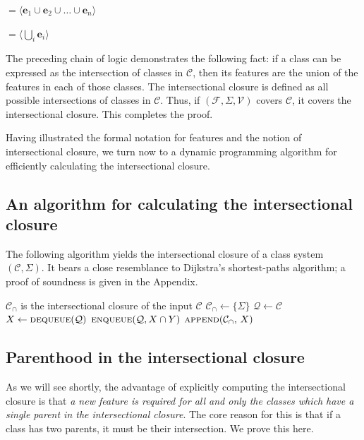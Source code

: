\documentclass[11pt, oneside]{article}   	%
\begin{document}
\quad $= \langle \mathbf{e}_1 \cup \mathbf{e}_2 \cup \ldots \cup \mathbf{e}_n \rangle$

\quad $= \langle \bigcup_i  \mathbf{e}_i \rangle$

\vspace{\baselineskip} \noindent The preceding chain of logic demonstrates the following fact: if a class can be expressed as the intersection of classes in $\mathcal C$, then its features are the union of the features in each of those classes. The intersectional closure is defined as all possible intersections of classes in $\mathcal C$. Thus, if $(\mathcal F, \Sigma, \mathcal V)$ covers $\mathcal C$, it covers the intersectional closure. This completes the proof.

Having illustrated the formal notation for features and the notion of intersectional closure, we turn now to a dynamic programming algorithm for efficiently calculating the intersectional closure.

\subsection{An algorithm for calculating the intersectional closure}

The following algorithm yields the intersectional closure of a class system $(\mathcal C, \Sigma)$. It bears a close resemblance to Dijkstra's shortest-paths algorithm; a proof of soundness is given in the Appendix.

\noindent \begin{algorithmic}
    \ENSURE $\mathcal C_\cap$ is the intersectional closure of the input $\mathcal C$
    \STATE
    \STATE $\mathcal C_\cap \leftarrow \{ \Sigma \} $
    \STATE $\mathcal Q \leftarrow \mathcal C$
    \STATE
        \STATE $X \leftarrow \textsc{dequeue}(\mathcal Q)$
                \STATE $\textsc{enqueue}(\mathcal Q, X \cap Y)$
            \ENDFOR
            \STATE $\textsc{append}(\mathcal C_\cap, \, X)$
        \ENDIF
    \ENDWHILE
\end{algorithmic}


\subsection{Parenthood in the intersectional closure}

As we will see shortly, the advantage of explicitly computing the intersectional closure is that \textit{a new feature is required for all and only the classes which have a single parent in the intersectional closure}. The core reason for this is that if a class has two parents, it must be their intersection. We prove this here.
\end{document}
